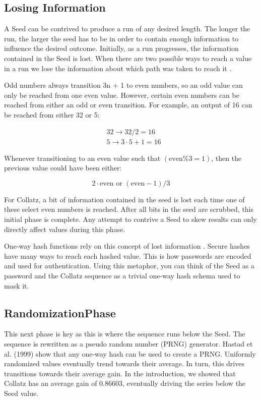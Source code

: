 \documentclass[letterpaper]{article}
\begin{document}
\begin{multicols}{2}
    \subsection{Losing Information}
    A Seed can be contrived to produce a run of any desired length. The longer the run, the larger the seed has to be in order to contain enough information to influence the desired outcome. Initially, as a run progresses, the information contained in the Seed is lost. When there are two possible ways to reach a value in a run we lose the information about which path was taken to reach it \cite{2}.

    Odd numbers always transition 3n + 1 to even numbers, so an odd value can only be reached from one even value. However, certain even numbers can be reached from either an odd or even transition. For example, an output of 16 can be reached from either 32 or 5:

    \[
        \begin{aligned}
             & 32 \rightarrow 32 / 2 = 16 \\
             & 5 \rightarrow 3\cdot5 + 1 = 16
        \end{aligned}
    \]

    Whenever transitioning to an even value such that $(\text{even} \% 3 = 1)$, then the previous value could have been either: 
    
    \[
        2 \cdot \text{even or } (\text{even} - 1) / 3
    \]

    For Collatz, a bit of information contained in the seed is lost each time one of these select even numbers is reached. After all bits in the seed are scrubbed, this initial phase is complete. Any attempt to contrive a Seed to skew results can only directly affect values during this phase.

    One-way hash functions rely on this concept of lost information \cite{3}. Secure hashes have many ways to reach each hashed value. This is how passwords are encoded and used for authentication. Using this metaphor, you can think of the Seed as a password and the Collatz sequence as a trivial one-way hash schema used to mask it.

    \subsection{RandomizationPhase}

    This next phase is key as this is where the sequence runs below the Seed. The sequence is rewritten as a pseudo random number (PRNG) generator. Hastad et al. (1999) \cite{4} show that any one-way hash can be used to create a PRNG. Uniformly randomized values eventually trend towards their average. In turn, this drives transitions towards their average gain. In the introduction, we showed that Collatz has an average gain of $0.86603$, eventually driving the series below the Seed value.


\end{multicols}
\end{document}
